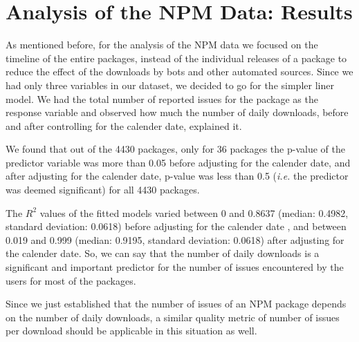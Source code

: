 \documentclass[smallextended]{svjour3}       %
\begin{document}
\section{Analysis of the NPM Data: Results}\label{s:npm}

As mentioned before, for the analysis of the NPM data we focused on the timeline of the entire packages, instead of the individual releases of a package to reduce the effect of the downloads by bots and other automated sources. Since we had only three variables in our dataset, we decided to go for the simpler liner model. We had the total number of reported issues for the package as the response variable and observed how much the number of daily downloads, before and after controlling for the calender date, explained it. 

We found that out of the 4430 packages, only for 36 packages the p-value of the predictor variable was more than 0.05 before adjusting for the calender date, and after adjusting for the calender date, p-value was less than 0.5 (\emph{i.e.} the predictor was deemed significant) for all 4430 packages. 

The $R^2$ values of the fitted models varied between 0 and 0.8637 (median: 0.4982, standard deviation: 0.0618) before adjusting for the calender date , and between 0.019 and 0.999 (median: 0.9195, standard deviation: 0.0618) after  adjusting for the calender date. So, we can say that the number of daily downloads is a significant and important predictor for the number of issues encountered by the users for most of the packages. 

Since we just established that the number of issues of an NPM package depends on the number of daily downloads, a similar quality metric of number of issues per download should be applicable in this situation as well.  
\end{document}
